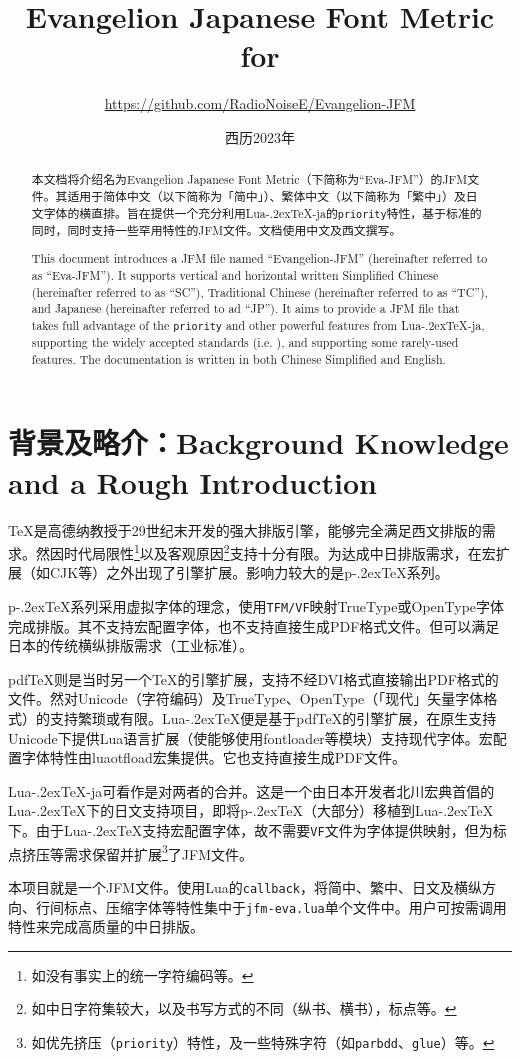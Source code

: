 \documentclass{ltjsarticle}
\title{\sffamily\bfseries Evangelion Japanese Font Metric for \LuaTeX}
\author{\large \url{https://github.com/RadioNoiseE/Evangelion-JFM}}
\date{西历2023年}
\def\段{\par}
\def\LuaTeX{Lua\kern-.2ex\TeX}
\def\pTeX{p\kern-.2ex\TeX}
\def\pdfTeX{pdf\TeX}
\begin{document}
\zw\parskip=2pt

\maketitle

\begin{abstract}
    本文档将介绍名为Evangelion Japanese Font Metric（下简称为``\textsf{Eva-JFM}''）的JFM文件。其适用于简体中文（以下简称为「简中」）、繁体中文（以下简称为「繁中」）及日文字体的横直排。旨在提供一个充分利用\LuaTeX{}-ja的\texttt{priority}特性，基于标准\cite{jlreq}的同时，同时支持一些罕用特性的JFM文件。文档使用中文及西文撰写。\段
    This document introduces a JFM file named ``Evangelion-JFM'' (hereinafter referred to as ``\textsf{Eva-JFM}''). It supports vertical and horizontal written Simplified Chinese (hereinafter referred to as ``SC''), Traditional Chinese (hereinafter referred to as ``TC''), and Japanese (hereinafter referred to ad ``JP''). It aims to provide a JFM file that takes full advantage of the \texttt{priority} and other powerful features from \LuaTeX{}-ja, supporting the widely accepted standards (i.e. \cite{jlreq}), and supporting some rarely-used features. The documentation is written in both Chinese Simplified and English.
\end{abstract}

\section{背景及略介：Background Knowledge and a Rough Introduction}
\TeX{}是高德纳教授于29世纪末开发的强大排版引擎，能够完全满足西文排版的需求。然因时代局限性\footnote{如没有事实上的统一字符编码等。}以及客观原因\footnote{如中日字符集较大，以及书写方式的不同（纵书、横书），标点等。}支持十分有限。为达成中日排版需求，在宏扩展（如\textsf{CJK}等）之外出现了引擎扩展。影响力较大的是\pTeX{}系列。\段
\pTeX{}系列采用虚拟字体的理念，使用\texttt{TFM/VF}映射TrueType或OpenType字体完成排版。其不支持宏配置字体，也不支持直接生成PDF格式文件。但可以满足日本的传统横纵排版需求（工业标准）。\段
\pdfTeX{}则是当时另一个\TeX{}的引擎扩展，支持不经DVI格式直接输出PDF格式的文件。然对Unicode（字符编码）及TrueType、OpenType（「现代」矢量字体格式）的支持繁琐或有限。\LuaTeX{}便是基于\pdfTeX{}的引擎扩展，在原生支持Unicode下提供Lua语言扩展（使能够使用\textsf{fontloader}等模块）支持现代字体。宏配置字体特性由\textsf{luaotfload}宏集提供。它也支持直接生成PDF文件。\段
\LuaTeX{}-ja可看作是对两者的合并。这是一个由日本开发者北川宏典首倡的\LuaTeX{}下的日文支持项目，即将\pTeX{}（大部分）移植到\LuaTeX{}下。由于\LuaTeX{}支持宏配置字体，故不需要\texttt{VF}文件为字体提供映射，但为标点挤压等需求保留并扩展\footnote{如优先挤压（\texttt{priority}）特性，及一些特殊字符（如\texttt{parbdd}、\texttt{glue}）等。}了JFM文件。\段
本项目就是一个JFM文件。使用Lua的\texttt{callback}，将简中、繁中、日文及横纵方向、行间标点、压缩字体等特性集中于\texttt{jfm-eva.lua}单个文件中。用户可按需调用特性来完成高质量的中日排版。
\end{document}
